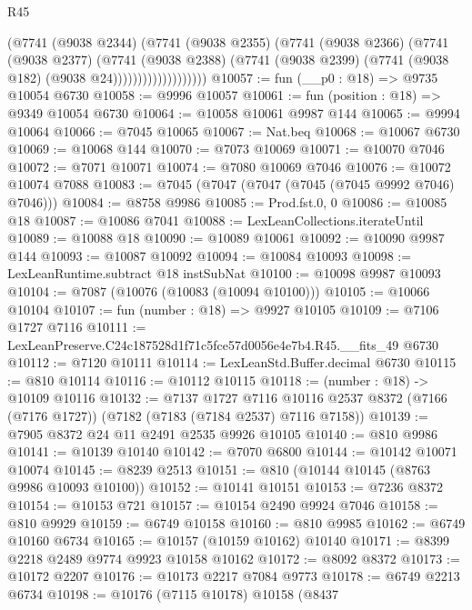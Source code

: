 \begin{lexlean}{R45}
\begin{coremodule}
{                          (@7741
                            (@9038 @2344)
                            (@7741
                              (@9038 @2355)
                              (@7741
                                (@9038 @2366)
                                (@7741
                                  (@9038 @2377)
                                  (@7741
                                    (@9038 @2388)
                                    (@7741
                                      (@9038 @2399)
                                      (@7741 (@9038 @182) (@9038 @24)))))))))))))))))))
@10057 := fun (__p0 : @18) => @9735 @10054 @6730
@10058 := @9996 @10057
@10061 := fun (position : @18) => @9349 @10054 @6730
@10064 := @10058 @10061 @9987 @144
@10065 := @9994 @10064
@10066 := @7045 @10065
@10067 := Nat.beq
@10068 := @10067 @6730
@10069 := @10068 @144
@10070 := @7073 @10069
@10071 := @10070 @7046
@10072 := @7071 @10071
@10074 := @7080 @10069 @7046
@10076 := @10072 @10074 @7088
@10083 := @7045 (@7047 (@7047 (@7045 (@7045 @9992 @7046) @7046)))
@10084 := @8758 @9986
@10085 := Prod.fst.{0, 0}
@10086 := @10085 @18
@10087 := @10086 @7041
@10088 := LexLeanCollections.iterateUntil
@10089 := @10088 @18
@10090 := @10089 @10061
@10092 := @10090 @9987 @144
@10093 := @10087 @10092
@10094 := @10084 @10093
@10098 := LexLeanRuntime.subtract @18 instSubNat
@10100 := @10098 @9987 @10093
@10104 := @7087 (@10076 (@10083 (@10094 @10100)))
@10105 := @10066 @10104
@10107 := fun (number : @18) => @9927 @10105
@10109 := @7106 @1727 @7116
@10111 := LexLeanPreserve.C24c187528d1f71c5fce57d0056e4e7b4.R45.__fits_49 @6730
@10112 := @7120 @10111
@10114 := LexLeanStd.Buffer.decimal @6730
@10115 := @810 @10114
@10116 := @10112 @10115
@10118 := (number : @18) -> @10109 @10116
@10132 := @7137
    @1727
    @7116
    @10116
    @2537
    @8372
    (@7166 (@7176 @1727))
    (@7182 (@7183 (@7184 @2537) @7116 @7158))
@10139 := @7905 @8372 @24 @11 @2491 @2535 @9926 @10105
@10140 := @810 @9986
@10141 := @10139 @10140
@10142 := @7070 @6800
@10144 := @10142 @10071 @10074
@10145 := @8239 @2513
@10151 := @810 (@10144 @10145 (@8763 @9986 @10093 @10100))
@10152 := @10141 @10151
@10153 := @7236 @8372
@10154 := @10153 @721
@10157 := @10154 @2490 @9924 @7046
@10158 := @810 @9929
@10159 := @6749 @10158
@10160 := @810 @9985
@10162 := @6749 @10160 @6734
@10165 := @10157 (@10159 @10162) @10140
@10171 := @8399 @2218 @2489 @9774 @9923 @10158 @10162
@10172 := @8092 @8372
@10173 := @10172 @2207
@10176 := @10173 @2217 @7084 @9773
@10178 := @6749 @2213 @6734
@10198 := @10176
    (@7115 @10178)
    @10158
    (@8437
}
\end{coremodule}
\end{lexlean}
